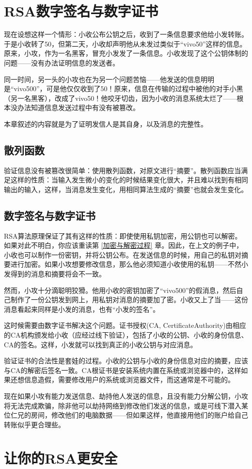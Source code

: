 \documentclass[a4paper]{article}  %
\begin{document}
\section{RSA数字签名与数字证书}

现在设想这样一个情形：小收公布公钥之后，收到了一条信息要求他给小发转账。于是小收转了50，但第二天，小收却声明他从未发过类似于“vivo50”这样的信息。原来，小攻，作为一名黑客，冒充小发发了一条信息。小收发现了这个公钥体制的问题——没有办法证明信息的发送者。

同一时间，另一头的小攻也在为另一个问题苦恼——他发送的信息明明是“vivo500”，可是他仅仅收到了50！原来，信息在传输的过程中被他的对手小黑（另一名黑客），改成了vivo50！他咬牙切齿，因为小收的消息系统太烂了——根本没办法知道信息发送过程中有没有被篡改。

本章叙述的内容就是为了证明发信人是其自身，以及消息的完整性。

\subsection{散列函数} \label{散列函数}

验证信息没有被篡改很简单：使用散列函数，对原文进行“摘要”。散列函数应当满足这样的性质：当输入发生微小的变化的时候结果变化很大，并且难以找到有相同输出的输入，这样，当消息发生变化，用相同算法生成的“摘要”也就会发生变化。 %

\subsection{数字签名与数字证书}

RSA算法原理保证了其有这样的性质：即使使用私钥加密，用公钥也可以解密。如果对此不明白，你应该重读第 \ref{加密与解密过程} 章。因此，在上文的例子中，小收也可以制作一份密钥，并将公钥公布。在发送信息的时候，用自己的私钥对摘要进行加密。如果小攻想要修改信息，那么他必须知道小收使用的私钥——不然小发得到的消息和摘要将会不一致。

然而，小攻十分滴聪明狡猾。他用小收的密钥加密了“vivo500”的假消息，然后自己制作了一份公钥发到网上，用私钥对消息的摘要加了密。小收又上了当——这份消息看起来同样是小发的消息，也有“小发的签名”。

这时候需要由数字证书解决这个问题。证书授权(CA, CertificateAuthority)由相应的CA机构颁发给小收（应经过线下验证），包括了小收的公钥、小收的身份信息、CA的签名。这样，小发就可以找到真正的小收公钥与对应消息。

验证证书的合法性是套娃的过程。小收的公钥与小收的身份信息对应的摘要，应该与CA的解密后签名一致。CA根证书是安装系统内置在系统或浏览器中的，这样如果还想信息造假，需要修改用户的系统或浏览器文件，而这通常是不可能的。

现在如果小攻有能力发送信息、劫持他人发送的信息，且没有能力分解公钥，小攻将无法完成欺骗，除非他可以劫持网络到修改他们发送的信息，或是可线下潜入某位仁兄的房间，修改他们的电脑数据——但如果这样，他直接用他们的账户给自己转账似乎更合理些。

\section[实现细节]{让你的RSA更安全}



\end{document}
